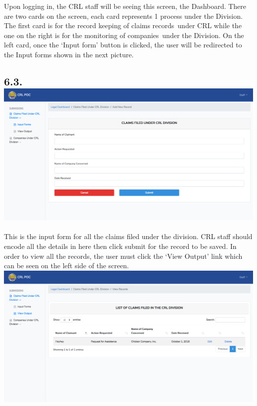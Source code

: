 \documentclass{article}
\begin{document}
\noindent{}Upon logging in, the CRL staff will be seeing this
screen, the Dashboard. There are two cards on the screen, each card
represents 1 process under the Division. The first card is for the
record keeping of claims records under CRL while the one on the right is for the
monitoring of companies under the Division. On the left card, once the ‘Input form’
button is clicked, the user will be redirected to the Input forms shown
in the next picture.%

\subsection{6.3.\hspace*{0.5em}\includegraphics[keepaspectratio=true]{up-ic-screens/image153}{}}\label{sec-up-ic-screensimage153png}%

\noindent{}This is the input form for all the claims filed under
the division. CRL staff should encode all the details in here then click
submit for the record to be saved. In order to view all the records, the
user must click the ‘View Output’ link which can be seen on the left
side of the screen.\includegraphics[keepaspectratio=true]{up-ic-screens/image202}{}%
\end{document}
